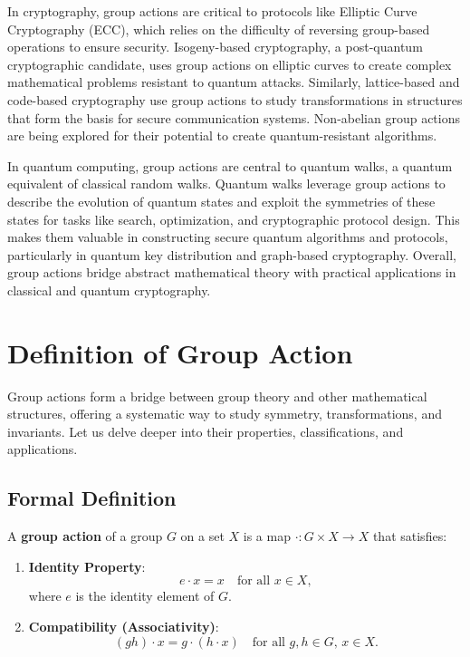 \documentclass[11pt]{article}
\theoremstyle{definition}
\begin{document}
In cryptography, group actions are critical to protocols like Elliptic Curve Cryptography (ECC), which relies on the difficulty of reversing group-based operations to ensure security. Isogeny-based cryptography, a post-quantum cryptographic candidate, uses group actions on elliptic curves to create complex mathematical problems resistant to quantum attacks. Similarly, lattice-based and code-based cryptography use group actions to study transformations in structures that form the basis for secure communication systems. Non-abelian group actions are being explored for their potential to create quantum-resistant algorithms.

In quantum computing, group actions are central to quantum walks, a quantum equivalent of classical random walks. Quantum walks leverage group actions to describe the evolution of quantum states and exploit the symmetries of these states for tasks like search, optimization, and cryptographic protocol design. This makes them valuable in constructing secure quantum algorithms and protocols, particularly in quantum key distribution and graph-based cryptography. Overall, group actions bridge abstract mathematical theory with practical applications in classical and quantum cryptography.


\section*{Definition of Group Action}

Group actions form a bridge between group theory and other mathematical structures, offering a systematic way to study symmetry, transformations, and invariants. Let us delve deeper into their properties, classifications, and applications.

\subsection*{Formal Definition}

A \textbf{group action} of a group \( G \) on a set \( X \) is a map \( \cdot : G \times X \to X \) that satisfies:

\begin{enumerate}
    \item \textbf{Identity Property}:
    \[
    e \cdot x = x \quad \text{for all } x \in X,
    \]
    where \( e \) is the identity element of \( G \).

    \item \textbf{Compatibility (Associativity)}:
    \[
    (gh) \cdot x = g \cdot (h \cdot x) \quad \text{for all } g, h \in G, \, x \in X.
    \]
\end{enumerate}
\end{document}
